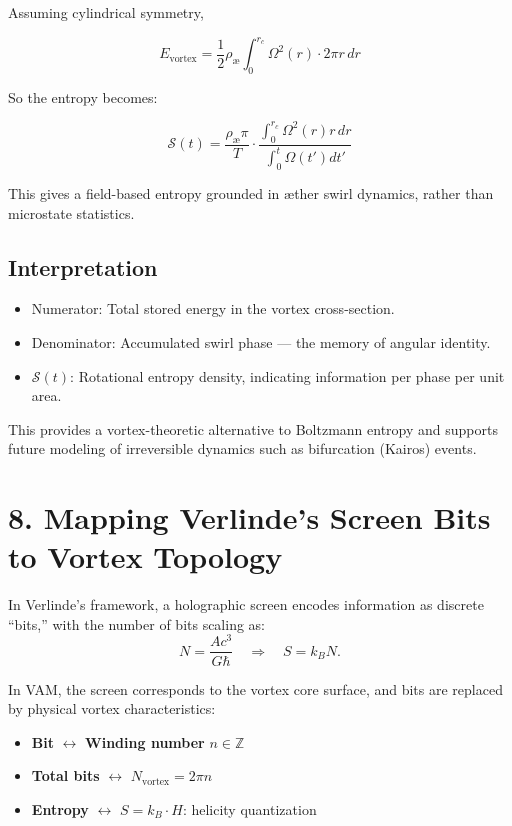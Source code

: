 \documentclass[11pt]{article}
\begin{document}
Assuming cylindrical symmetry,

\begin{equation}
E_\text{vortex} = \frac{1}{2} \rho_\text{\ae} \int_0^{r_c} \Omega^2(r) \cdot 2\pi r \, dr
\end{equation}

So the entropy becomes:

\begin{equation}
\boxed{
\mathcal{S}(t) = \frac{\rho_\text{\ae} \pi}{T} \cdot \frac{\int_0^{r_c} \Omega^2(r) r \, dr}{\int_0^t \Omega(t') dt'}
}
\end{equation}

This gives a field-based entropy grounded in æther swirl dynamics, rather than microstate statistics.

\subsection*{Interpretation}

\begin{itemize}
\item Numerator: Total stored energy in the vortex cross-section.
\item Denominator: Accumulated swirl phase — the memory of angular identity.
    \item $\mathcal{S}(t)$: Rotational entropy density, indicating information per phase per unit area.
\end{itemize}

This provides a vortex-theoretic alternative to Boltzmann entropy and supports future modeling of irreversible dynamics such as bifurcation (Kairos) events.

\section*{8. Mapping Verlinde's Screen Bits to Vortex Topology}

In Verlinde's framework, a holographic screen encodes information as discrete ``bits,'' with the number of bits scaling as:
\begin{equation}
N = \frac{A c^3}{G \hbar} \quad \Rightarrow \quad S = k_B N.
\end{equation}

In VAM, the screen corresponds to the vortex core surface, and bits are replaced by physical vortex characteristics:
\begin{itemize}
    \item \textbf{Bit} $\leftrightarrow$ \textbf{Winding number} $n \in \mathbb{Z}$
    \item \textbf{Total bits} $\leftrightarrow$ $N_\text{vortex} = 2\pi n$
    \item \textbf{Entropy} $\leftrightarrow$ $S = k_B \cdot H$: helicity quantization
\end{itemize}
\end{document}
